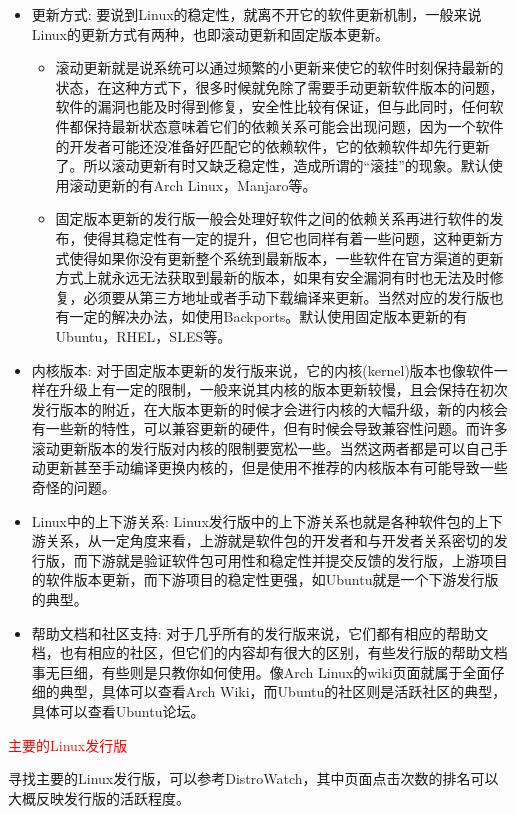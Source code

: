 \documentclass[utf8]{book}
\begin{document}
	\begin{itemize}
		\item 更新方式:   要说到Linux的稳定性，就离不开它的软件更新机制，一般来说Linux的更新方式有两种，也即滚动更新和固定版本更新。
		\begin{itemize}
			\item  滚动更新就是说系统可以通过频繁的小更新来使它的软件时刻保持最新的状态，在这种方式下，很多时候就免除了需要手动更新软件版本的问题，软件的漏洞也能及时得到修复，安全性比较有保证，但与此同时，任何软件都保持最新状态意味着它们的依赖关系可能会出现问题，因为一个软件的开发者可能还没准备好匹配它的依赖软件，它的依赖软件却先行更新了。所以滚动更新有时又缺乏稳定性，造成所谓的“滚挂”的现象。默认使用滚动更新的有Arch Linux，Manjaro等。
			\item         固定版本更新的发行版一般会处理好软件之间的依赖关系再进行软件的发布，使得其稳定性有一定的提升，但它也同样有着一些问题，这种更新方式使得如果你没有更新整个系统到最新版本，一些软件在官方渠道的更新方式上就永远无法获取到最新的版本，如果有安全漏洞有时也无法及时修复，必须要从第三方地址或者手动下载编译来更新。当然对应的发行版也有一定的解决办法，如使用Backports。默认使用固定版本更新的有Ubuntu，RHEL，SLES等。
		\end{itemize}
		\item 内核版本:        对于固定版本更新的发行版来说，它的内核(kernel)版本也像软件一样在升级上有一定的限制，一般来说其内核的版本更新较慢，且会保持在初次发行版本的附近，在大版本更新的时候才会进行内核的大幅升级，新的内核会有一些新的特性，可以兼容更新的硬件，但有时候会导致兼容性问题。而许多滚动更新版本的发行版对内核的限制要宽松一些。当然这两者都是可以自己手动更新甚至手动编译更换内核的，但是使用不推荐的内核版本有可能导致一些奇怪的问题。
		\item Linux中的上下游关系:  Linux发行版中的上下游关系也就是各种软件包的上下游关系，从一定角度来看，上游就是软件包的开发者和与开发者关系密切的发行版，而下游就是验证软件包可用性和稳定性并提交反馈的发行版，上游项目的软件版本更新，而下游项目的稳定性更强，如Ubuntu就是一个下游发行版的典型。
		\item 帮助文档和社区支持:   对于几乎所有的发行版来说，它们都有相应的帮助文档，也有相应的社区，但它们的内容却有很大的区别，有些发行版的帮助文档事无巨细，有些则是只教你如何使用。像Arch Linux的wiki页面就属于全面仔细的典型，具体可以查看Arch Wiki，而Ubuntu的社区则是活跃社区的典型，具体可以查看Ubuntu论坛。
	\end{itemize}
	
	\begin{center}
		{\LARGE \textcolor{red}{主要的Linux发行版}}
	\end{center}
	   寻找主要的Linux发行版，可以参考DistroWatch，其中页面点击次数的排名可以大概反映发行版的活跃程度。
	   
\end{document}
